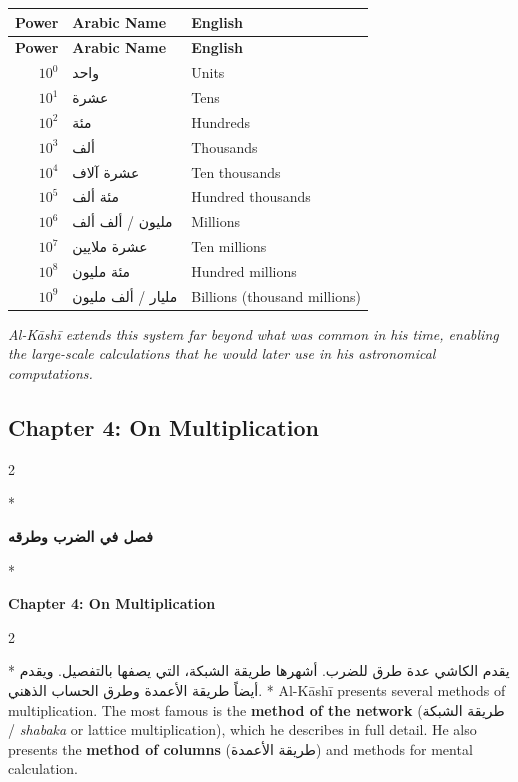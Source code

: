 \documentclass[11pt,a4paper]{article}
\newcommand{\cnote}[1]{\textcolor{notecolor}{\textit{#1}}}
\newcommand{\ar}[1]{\arabicfont\beginR #1\endR}
\newenvironment{bilingual}{%
  \vspace{0.3em}%
  \begin{paracol}{2}%
}{%
  \end{paracol}%
  \vspace{0.3em}%
}
\begin{document}
\begin{longtable}{|r|l|l|}
\hline
\textbf{Power} & \textbf{Arabic Name} & \textbf{English} \\
\hline
\endfirsthead
\hline
\textbf{Power} & \textbf{Arabic Name} & \textbf{English} \\
\hline
\endhead
$10^0$ & \ar{واحد} & Units \\
\hline
$10^1$ & \ar{عشرة} & Tens \\
\hline
$10^2$ & \ar{مئة} & Hundreds \\
\hline
$10^3$ & \ar{ألف} & Thousands \\
\hline
$10^4$ & \ar{عشرة آلاف} & Ten thousands \\
\hline
$10^5$ & \ar{مئة ألف} & Hundred thousands \\
\hline
$10^6$ & \ar{مليون} / \ar{ألف ألف} & Millions \\
\hline
$10^7$ & \ar{عشرة ملايين} & Ten millions \\
\hline
$10^8$ & \ar{مئة مليون} & Hundred millions \\
\hline
$10^9$ & \ar{مليار} / \ar{ألف مليون} & Billions (thousand millions) \\
\hline
\end{longtable}

\cnote{Al-K\=ash\=i extends this system far beyond what was common in his
time, enabling the large-scale calculations that he would later use in
his astronomical computations.}

\subsection{Chapter 4: On Multiplication}

\begin{bilingual}
\switchcolumn[0]*
\begin{center}
\textbf{\color{chapcolor}\ar{فصل في الضرب وطرقه}}
\end{center}
\switchcolumn[1]*
\begin{center}
\textbf{\color{chapcolor}Chapter 4: On Multiplication}
\end{center}
\end{bilingual}

\begin{bilingual}
\switchcolumn[0]*
\ar{يقدم الكاشي عدة طرق للضرب. أشهرها طريقة الشبكة، التي يصفها بالتفصيل. ويقدم أيضاً طريقة الأعمدة وطرق الحساب الذهني.}
\switchcolumn[1]*
Al-K\=ash\=i presents several methods of multiplication. The most famous is
the \textbf{method of the network} (\ar{طريقة الشبكة} /
\textit{shabaka} or lattice multiplication), which he describes in full
detail. He also presents the \textbf{method of columns}
(\ar{طريقة الأعمدة}) and methods for mental calculation.
\end{bilingual}
\end{document}
